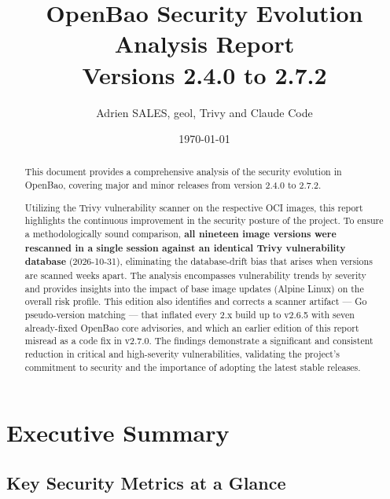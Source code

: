 \documentclass{article}
\title{\textbf{OpenBao Security Evolution Analysis Report} \\ \large Versions 2.4.0 to 2.7.2}
\author{Adrien SALES, geol, Trivy and Claude Code}
\date{\today}
\begin{document}
\maketitle

\begin{abstract}
This document provides a comprehensive analysis of the security evolution in OpenBao, covering major and minor releases from version 2.4.0 to 2.7.2.

Utilizing the Trivy vulnerability scanner on the respective OCI images, this report highlights the continuous improvement in the security posture of the project. To ensure a methodologically sound comparison, \textbf{all nineteen image versions were rescanned in a single session against an identical Trivy vulnerability database} (2026-10-31), eliminating the database-drift bias that arises when versions are scanned weeks apart. The analysis encompasses vulnerability trends by severity and provides insights into the impact of base image updates (Alpine Linux) on the overall risk profile. This edition also identifies and corrects a scanner artifact --- Go pseudo-version matching --- that inflated every 2.x build up to v2.6.5 with seven already-fixed OpenBao core advisories, and which an earlier edition of this report misread as a code fix in v2.7.0. The findings demonstrate a significant and consistent reduction in critical and high-severity vulnerabilities, validating the project's commitment to security and the importance of adopting the latest stable releases.
\end{abstract}

\clearpage

\section{Executive Summary}

\subsection{Key Security Metrics at a Glance}
\end{document}
